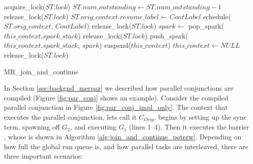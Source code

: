 \begin{algorithm}
\begin{algorithmic}[1]
  \State acquire\_lock($ST.lock$)
  \State $ST.num\_outstanding \gets ST.num\_outstanding - 1$
      \State release\_lock($ST.lock$)
    \Else
      \State $ST.orig\_context.resume\_label \gets ContLabel$
      \State schedule($ST.orig\_context$, $ContLabel$)
      \State release\_lock($ST.lock$)
    \EndIf
  \Else
    \State $spark \gets$ pop\_spark($this\_context.spark\_stack$)
        \State release\_lock($ST.lock$)
      \Else
        \State push\_spark($this\_context.spark\_stack$, $spark$)
      \EndIf
    \EndIf
       \State suspend($this\_context$)
       \State $this\_context \gets NULL$
    \EndIf
    \State release\_lock($ST.lock$)
  \EndIf
\EndProcedure
\end{algorithmic}
\caption{MR\_join\_and\_continue}
\label{alg:join_and_continue_peterw}
\end{algorithm}

In Section \ref{sec:backgnd_merpar} we described how parallel
conjunctions are compiled
(Figure \ref{fig:par_conj} shows an example).
Consider the compiled parallel conjunction in Figure
\ref{fig:par_conj_impl_only}.
The context that executes the parallel conjunction,
lets call it $C_{Orig}$,
begins by
setting up the sync term,
spawning off $G_2$,
and executing $G_1$ (lines 1--4).
Then it executes the barrier \joinandcontinue,
whose is shown in
Algorithm \ref{alg:join_and_continue_peterw}.
Depending on how full the global run queue is,
and how parallel tasks are interleaved,
there are three important scenarios:

